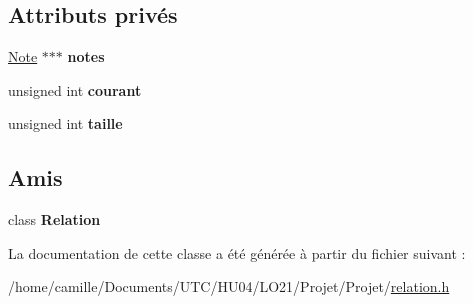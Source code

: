 \subsection*{Attributs privés}
\begin{DoxyCompactItemize}
\item 
\hypertarget{class_relation_1_1_iterator_aea16ae10fec907f4c7016afb373d78ab}{\hyperlink{class_note}{Note} $\ast$$\ast$$\ast$ {\bfseries notes}}\label{class_relation_1_1_iterator_aea16ae10fec907f4c7016afb373d78ab}

\item 
\hypertarget{class_relation_1_1_iterator_ace78ab8d273d1afddb1890d34731b252}{unsigned int {\bfseries courant}}\label{class_relation_1_1_iterator_ace78ab8d273d1afddb1890d34731b252}

\item 
\hypertarget{class_relation_1_1_iterator_ae498bfc50d1a75d085187ef08cce9b66}{unsigned int {\bfseries taille}}\label{class_relation_1_1_iterator_ae498bfc50d1a75d085187ef08cce9b66}

\end{DoxyCompactItemize}
\subsection*{Amis}
\begin{DoxyCompactItemize}
\item 
\hypertarget{class_relation_1_1_iterator_a7ee004262f27f8c916688911a71e3aa1}{class {\bfseries Relation}}\label{class_relation_1_1_iterator_a7ee004262f27f8c916688911a71e3aa1}

\end{DoxyCompactItemize}


La documentation de cette classe a été générée à partir du fichier suivant \-:\begin{DoxyCompactItemize}
\item 
/home/camille/\-Documents/\-U\-T\-C/\-H\-U04/\-L\-O21/\-Projet/\-Projet/\hyperlink{relation_8h}{relation.\-h}\end{DoxyCompactItemize}
